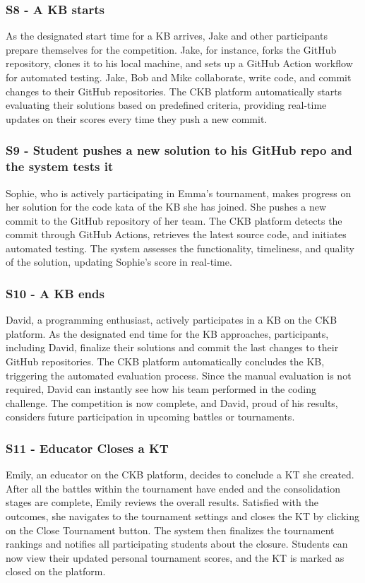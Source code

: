 \documentclass[11pt]{report}
\begin{document}
\subsubsection{S8 - A KB starts}
    As the designated start time for a KB arrives, Jake and other participants prepare themselves for the competition.
    Jake, for instance, forks the GitHub repository, clones it to his local machine, and sets up a GitHub Action workflow for automated testing.
    Jake, Bob and Mike collaborate, write code, and commit changes to their GitHub repositories.
    The CKB platform automatically starts evaluating their solutions based on predefined criteria, providing real-time
    updates on their scores every time they push a new commit.
\subsubsection{S9 - Student pushes a new solution to his GitHub repo and the system tests it}
    Sophie, who is actively participating in Emma's tournament, makes progress on her solution for the code kata of the KB she has joined.
    She pushes a new commit to the GitHub repository of her team.
    The CKB platform detects the commit through GitHub Actions,
    retrieves the latest source code, and initiates automated testing.
    The system assesses the functionality, timeliness, and quality of the solution, updating Sophie's score in real-time.
\subsubsection{S10 - A KB ends}
    David, a programming enthusiast, actively participates in a KB on the CKB platform.
    As the designated end time for the KB approaches, participants, including David, finalize their solutions and commit
    the last changes to their GitHub repositories.
    The CKB platform automatically concludes the KB, triggering the automated evaluation process.
    Since the manual evaluation is not required, David can instantly see how his team performed in the coding challenge.
    The competition is now complete, and David, proud of his results,
    considers future participation in upcoming battles or tournaments.
\subsubsection{S11 - Educator Closes a KT}
    Emily, an educator on the CKB platform, decides to conclude a KT she created.
    After all the battles within the tournament have ended and the consolidation stages are complete, Emily reviews the overall results.
    Satisfied with the outcomes, she navigates to the tournament settings and closes the KT by clicking on the Close Tournament button.
    The system then finalizes the tournament rankings and notifies all participating students about the closure.
    Students can now view their updated personal tournament scores, and the KT is marked as closed on the platform.
\end{document}
